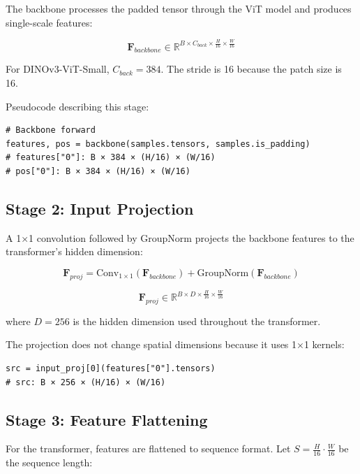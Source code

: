 \documentclass[12pt,a4paper]{article}
\newcommand{\B}[1]{\mathbf{#1}}
\begin{document}
The backbone processes the padded tensor through the ViT model and produces single-scale features:

\begin{equation}
\B{F}_{backbone} \in \mathbb{R}^{B \times C_{back} \times \frac{H}{16} \times \frac{W}{16}}
\end{equation}

For DINOv3-ViT-Small, $C_{back} = 384$. The stride is 16 because the patch size is 16.

Pseudocode describing this stage:

\begin{verbatim}
# Backbone forward
features, pos = backbone(samples.tensors, samples.is_padding)
# features["0"]: B × 384 × (H/16) × (W/16)
# pos["0"]: B × 384 × (H/16) × (W/16)
\end{verbatim}

\subsection{Stage 2: Input Projection}

A 1×1 convolution followed by GroupNorm projects the backbone features to the transformer's hidden dimension:

\begin{equation}
\B{F}_{proj} = \text{Conv}_{1\times1}(\B{F}_{backbone}) + \text{GroupNorm}(\B{F}_{backbone})
\end{equation}

\begin{equation}
\B{F}_{proj} \in \mathbb{R}^{B \times D \times \frac{H}{16} \times \frac{W}{16}}
\end{equation}

where $D = 256$ is the hidden dimension used throughout the transformer.

The projection does not change spatial dimensions because it uses 1×1 kernels:

\begin{verbatim}
src = input_proj[0](features["0"].tensors)
# src: B × 256 × (H/16) × (W/16)
\end{verbatim}

\subsection{Stage 3: Feature Flattening}

For the transformer, features are flattened to sequence format. Let $S = \frac{H}{16} \cdot \frac{W}{16}$ be the sequence length:
\end{document}
